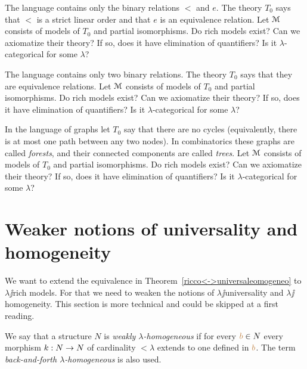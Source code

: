 \documentclass[creche.tex]{subfiles}
\begin{document}
\begin{exercise}
The language contains only the binary relations $<$ and $e$.
The theory $T_0$ says that $<$ is a strict linear order and that $e$ is an equivalence relation.
Let $\EuScript M$ consists of models of $T_0$ and partial isomorphisms.
Do rich models exist? Can we axiomatize their theory? If so, does it have elimination of quantifiers? Is it $\lambda$-categorical for some $\lambda$?\QED
\end{exercise}

\begin{exercise}
The language contains only two binary relations.
The theory $T_0$ says that they are equivalence relations.
Let $\EuScript M$ consists of models of $T_0$ and partial isomorphisms.
Do rich models exist? Can we axiomatize their theory? If so, does it have elimination of quantifiers? Is it $\lambda$-categorical for some $\lambda$?\QED
\end{exercise}

\begin{exercise}
In the language of graphs let $T_0$ say that there are no cycles (equivalently, there is at most one path between any two nodes).
In combinatorics these graphs are called \textit{forests}, and their connected components are called \textit{trees}.
Let $\EuScript M$ consists of models of $T_0$ and partial isomorphisms.
Do rich models exist? Can we axiomatize their theory? If so, does it have elimination of quantifiers? Is it $\lambda$-categorical for some $\lambda$?\QED
\end{exercise}

\section{Weaker notions of universality and homogeneity}\label{weak}

We want to extend the equivalence in Theorem~\ref{ricco<->universaleomogeneo} to $\lambda\jj$rich models.
For that we need to weaken the notions of $\lambda\jj$universality and  $\lambda\jj$homogeneity.
This section is more technical and could be skipped at a first reading.

\begin{definition}
We say that a structure $N$ is \emph{weakly $\lambda$-homogeneous\/} if for every ${\color{brown} b}\in N$ every morphism $k:N\rightarrow N$ of cardinality $<\lambda$ extends to one defined in ${\color{brown} b}$.
The term \emph{back-and-forth $\lambda$-homogeneous\/} is also used.\QED
\end{definition}
\end{document}
